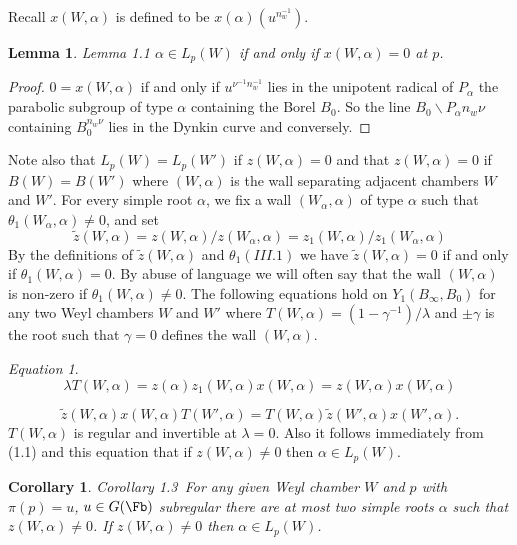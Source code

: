 \documentclass{memo-l}
\newtheorem{lemma}[theorem]{Lemma}
\newtheorem{corollary}[theorem]{Corollary}
\theoremstyle{definition}
\theoremstyle{remark}
\newtheorem{eqn}[theorem]{Equation}
\numberwithin{section}{chapter}
\numberwithin{equation}{chapter}
\begin{document}
Recall $x(W,{\alpha})$ is defined to be $x({\alpha})(u^{n_w^{-1}})$.

\begin{lemma}{Lemma 1.1} ${\alpha} \in L_{p}(W)$ if and only if
$x(W,{\alpha}) = 0$ at $p$.
\end{lemma}

\medpagebreak

\begin{proof}  $0 = x(W,{\alpha})$ if and only if $u^{\nu^{-1}n_w^{-1}}$ 
lies in the unipotent radical of $P_{{\alpha}}$
the parabolic subgroup of type ${\alpha}$ containing the Borel $B_{0}$.  So
the line $B_{0}\backslash P_{{\alpha}}n_{w}{\nu}$ containing $B_{0}^{n_w\nu}$
lies in the Dynkin curve and conversely.
\end{proof} 		       

{\medskip}

   Note also that $L_{p}(W) = L_{p}(W')$ if $z(W,{\alpha}) = 0$ and that
$z(W,{\alpha}) = 0$ if $B(W) = B(W')$ where $(W,{\alpha})$ is the wall
separating adjacent chambers $W$ and $W'$.  For every simple root
${\alpha}$, we fix a wall $(W_{{\alpha}},{\alpha})$ of type ${\alpha}$ such
that ${\theta}_{1}(W_{{\alpha}},{\alpha})\ne 0$, and set
$$
\tilde{z} (W,{\alpha}) = z(W,{\alpha})/z(W_{{\alpha}},{\alpha}) =
z_{1}(W,{\alpha})/z_{1}(W_{{\alpha}},{\alpha})
$$
By the definitions of $\tilde z (W,{\alpha})$ and ${\theta}_{1} (III.1)$ we
have $\tilde z (W,{\alpha}) = 0$ if and only if ${\theta}_{1}(W,{\alpha}) =
0$.  By abuse of language we will often say that the wall $(W,{\alpha})$ is
non-zero if ${\theta}_{1}(W,{\alpha})\ne 0$.  The following equations hold
on $Y_{1}(B_{{\infty}},B_{0})$ for any two Weyl chambers $W$ and $W'$ where
$T(W,{\alpha}) = (1-{\gamma}^{-1})/{\lambda}$ and ${\pm}{\gamma}$ is
the root such that ${\gamma} = 0$ defines the wall $(W,{\alpha})$.


\begin{eqn}  %
$$
\lambda T(W,{\alpha}) = z({\alpha})z_{1}(W,{\alpha})x(W,{\alpha}) =
z(W,{\alpha})x(W,{\alpha})
$$
\end{eqn}

$$
\tilde {z} (W,{\alpha})x(W,{\alpha})T(W',{\alpha}) = T(W,{\alpha})\tilde z
(W',{\alpha})x(W',{\alpha}) .
$$
$T(W,{\alpha})$ is regular and invertible at ${\lambda} = 0$.  Also it
follows immediately from (1.1) and this equation that if
$z(W,{\alpha})\ne 0$ then ${\alpha} \in L_{p}(W)$.

\medskip

\begin{corollary}{Corollary 1.3}\ For any given Weyl chamber $W$ and $p$ with
${\pi}(p) = u$, $u \in G(\Fb)$ subregular there are at most two simple
roots ${\alpha}$ such that $z(W,{\alpha})\ne 0$.  If $z(W,{\alpha})\ne 0$
then ${\alpha} \in L_{p}(W)$.
\end{corollary}
\end{document}
